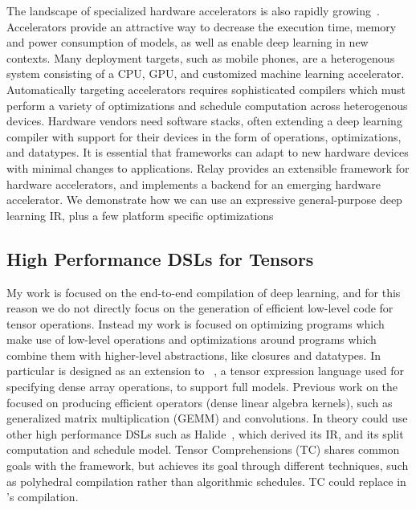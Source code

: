 The landscape of specialized hardware
  accelerators is also rapidly growing~\citep{
    moreau2018vta, OpenTPU, tpuv1}.
Accelerators provide an attractive way to decrease
  the execution time, memory and power consumption of models, as well
  as enable deep learning in new contexts.
Many deployment targets, such as mobile phones, are a heterogenous system
  consisting of a CPU, GPU, and customized machine learning accelerator.
Automatically targeting accelerators requires sophisticated compilers which
  must perform a variety of optimizations and schedule computation across
  heterogenous devices.
Hardware vendors need software stacks, often extending a deep learning
  compiler with support for their devices in the form of operations,
  optimizations, and datatypes.
It is essential that frameworks can adapt to new hardware devices
  with minimal changes to applications.
Relay provides an extensible framework for hardware accelerators,
  and implements a backend for \vta an emerging hardware accelerator\citep{moreau2018vta}.
We demonstrate how we can use an expressive general-purpose deep learning IR, plus
  a few platform specific optimizations

\subsection{High Performance DSLs for Tensors}

My work is focused on the end-to-end compilation of deep learning, and for
  this reason we do not directly focus on the generation of efficient low-level code for
  tensor operations.
Instead my work is focused on optimizing programs which make use of low-level operations
  and optimizations around programs which combine them with higher-level abstractions,
  like closures and datatypes.
In particular \relay is designed as an extension to \tvm~\citep{tvm_osdi18},
  a tensor expression language used for specifying dense array
  operations, to support full models.
Previous work on the \tvm focused on producing efficient operators
  (dense linear algebra kernels), such as generalized matrix multiplication (GEMM) and convolutions.
In theory \relay could use other high performance DSLs such as Halide~\citep{halide},
    which \tvm derived its IR, and its split computation and schedule model.
Tensor Comprehensions (TC) shares common goals with the \tvm framework, but achieves its goal
through different techniques, such as polyhedral compilation rather than algorithmic
schedules. TC could replace \tvm in \relay{}'s compilation.

